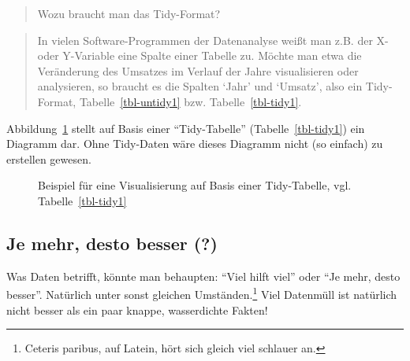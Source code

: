 \documentclass[
  letterpaper,
]{scrbook}
\theoremstyle{definition}
\theoremstyle{definition}
\theoremstyle{definition}
\theoremstyle{remark}
\begin{document}
\begin{quote}
{} Wozu braucht man das Tidy-Format?
\end{quote}

\begin{quote}
{} In vielen Software-Programmen der Datenanalyse
weißt man z.B. der X- oder Y-Variable eine Spalte einer Tabelle zu.
Möchte man etwa die Veränderung des Umsatzes im Verlauf der Jahre
visualisieren oder analysieren, so braucht es die Spalten
\enquote*{Jahr} und \enquote*{Umsatz}, also ein Tidy-Format,
Tabelle~\ref{tbl-untidy1} bzw. Tabelle~\ref{tbl-tidy1}.
\end{quote}

Abbildung~\ref{fig-tidy} stellt auf Basis einer \enquote{Tidy-Tabelle}
(Tabelle~\ref{tbl-tidy1}) ein Diagramm dar. Ohne Tidy-Daten wäre dieses
Diagramm nicht (so einfach) zu erstellen gewesen.

\begin{figure}


\caption{\label{fig-tidy}Beispiel für eine Visualisierung auf Basis
einer Tidy-Tabelle, vgl. Tabelle~\ref{tbl-tidy1}}

\end{figure}%

\subsection{Je mehr, desto besser (?)}\label{je-mehr-desto-besser}

Was Daten betrifft, könnte man behaupten: \enquote{Viel hilft viel} oder
\enquote{Je mehr, desto besser}. Natürlich unter sonst gleichen
Umständen.\footnote{Ceteris paribus, auf Latein, hört sich gleich viel
  schlauer an.} Viel Datenmüll ist natürlich nicht besser als ein paar
knappe, wasserdichte Fakten!
\end{document}
